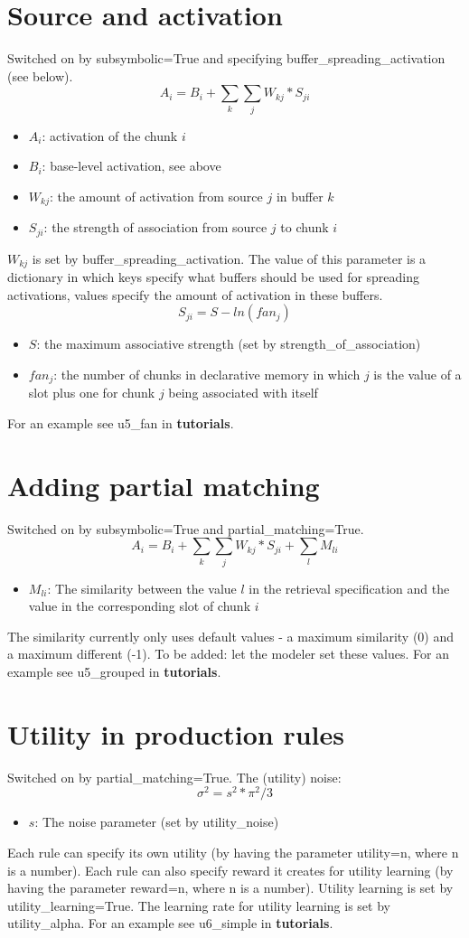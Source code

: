 \documentclass{article}
\begin{document}
\section*{Source and activation}
\noindent Switched on by subsymbolic=True and specifying buffer\_spreading\_activation (see below).\\
$$A_i = B_i + \sum_{k}\sum_{j}W_{kj}*S_{ji}$$
\begin{itemize}
\item $A_i$: activation of the chunk $i$
\item $B_i$: base-level activation, see above
\item $W_{kj}$: the amount of activation from source $j$ in buffer $k$
\item $S_{ji}$: the strength of association from source $j$ to chunk $i$
\end{itemize}
$W_{kj}$ is set by buffer\_spreading\_activation. The value of this parameter is a dictionary in which keys specify what buffers should be used for spreading activations, values specify the amount of activation in these buffers.
$$S_{ji}=S - ln( fan_j )$$
\begin{itemize}
    \item $S$: the maximum associative strength (set by strength\_of\_association)
    \item $fan_j$: the number of chunks in declarative memory in which $j$ is the value of a slot plus one for chunk $j$ being associated with itself
\end{itemize}
For an example see u5\_fan in \textbf{tutorials}.
\section*{Adding partial matching}
Switched on by subsymbolic=True and partial\_matching=True.
$$A_i = B_i + \sum_{k}\sum_{j}W_{kj}*S_{ji} + \sum_{l}M_{li}$$
\begin{itemize}
    \item $M_{li}$: The similarity between the value $l$ in the retrieval specification and the value in the corresponding slot of chunk $i$
\end{itemize}
The similarity currently only uses default values - a maximum similarity (0) and a maximum different (-1). To be added: let the modeler set these values. For an example see u5\_grouped in \textbf{tutorials}.
\section*{Utility in production rules}
\noindent Switched on by partial\_matching=True.
The (utility) noise:
$$\sigma^2=s^2*\pi^2/3$$
\begin{itemize}
    \item $s$: The noise parameter (set by utility\_noise)
\end{itemize}
Each rule can specify its own utility (by having the parameter utility=n, where n is a number). Each rule can also specify reward it creates for utility learning (by having the parameter reward=n, where n is a number). Utility learning is set by utility\_learning=True. The learning rate for utility learning is set by utility\_alpha. For an example see u6\_simple in \textbf{tutorials}.
\end{document}
